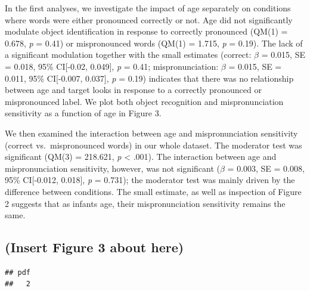 \documentclass[man]{apa6}
\theoremstyle{definition}
\theoremstyle{definition}
\theoremstyle{definition}
\theoremstyle{remark}
\begin{document}
In the first analyses, we investigate the impact of age separately on
conditions where words were either pronounced correctly or not. Age did
not significantly modulate object identification in response to
correctly pronounced (QM(1) = 0.678, \emph{p} = 0.41) or mispronounced
words (QM(1) = 1.715, \emph{p} = 0.19). The lack of a significant
modulation together with the small estimates (correct: \(\beta\) =
0.015, SE = 0.018, 95\% CI{[}-0.02, 0.049{]}, \emph{p} = 0.41;
mispronunciation: \(\beta\) = 0.015, SE = 0.011, 95\% CI{[}-0.007,
0.037{]}, \emph{p} = 0.19) indicates that there was no relationship
between age and target looks in response to a correctly pronounced or
mispronounced label. We plot both object recognition and
mispronunciation sensitivity as a function of age in Figure 3.

We then examined the interaction between age and mispronunciation
sensitivity (correct vs.~mispronounced words) in our whole dataset. The
moderator test was significant (QM(3) = 218.621, \emph{p} \textless{}
.001). The interaction between age and mispronunciation sensitivity,
however, was not significant (\(\beta\) = 0.003, SE = 0.008, 95\%
CI{[}-0.012, 0.018{]}, \emph{p} = 0.731); the moderator test was mainly
driven by the difference between conditions. The small estimate, as well
as inspection of Figure 2 suggests that as infants age, their
mispronunciation sensitivity remains the same.

\subsection{(Insert Figure 3 about
here)}\label{insert-figure-3-about-here}

\begin{verbatim}
## pdf 
##   2
\end{verbatim}
\end{document}

